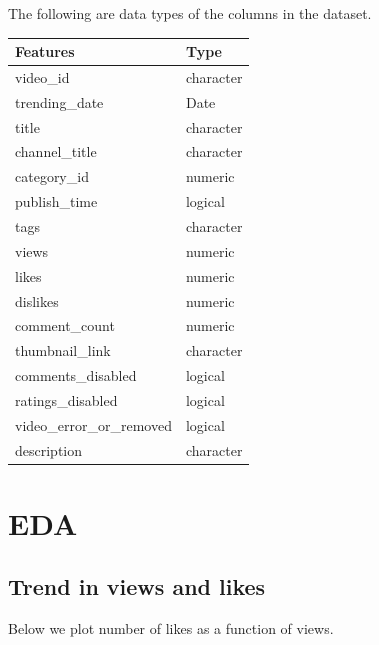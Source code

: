 \documentclass[]{article}
\newenvironment{Shaded}{\begin{snugshade}}{\end{snugshade}}
\newcommand{\KeywordTok}[1]{\textcolor[rgb]{0.13,0.29,0.53}{\textbf{#1}}}
\newcommand{\NormalTok}[1]{#1}
\newcommand{\OperatorTok}[1]{\textcolor[rgb]{0.81,0.36,0.00}{\textbf{#1}}}
\newcommand{\StringTok}[1]{\textcolor[rgb]{0.31,0.60,0.02}{#1}}
\begin{document}
The following are data types of the columns in the dataset.

\begin{Shaded}
\end{Shaded}

\begin{longtable}[]{@{}ll@{}}
\toprule
Features & Type\tabularnewline
\midrule
\endhead
video\_id & character\tabularnewline
trending\_date & Date\tabularnewline
title & character\tabularnewline
channel\_title & character\tabularnewline
category\_id & numeric\tabularnewline
publish\_time & logical\tabularnewline
tags & character\tabularnewline
views & numeric\tabularnewline
likes & numeric\tabularnewline
dislikes & numeric\tabularnewline
comment\_count & numeric\tabularnewline
thumbnail\_link & character\tabularnewline
comments\_disabled & logical\tabularnewline
ratings\_disabled & logical\tabularnewline
video\_error\_or\_removed & logical\tabularnewline
description & character\tabularnewline
\bottomrule
\end{longtable}

\hypertarget{eda}{%
\section{EDA}\label{eda}}

\hypertarget{trend-in-views-and-likes}{%
\subsection{Trend in views and likes}\label{trend-in-views-and-likes}}

Below we plot number of likes as a function of views.
\end{document}
